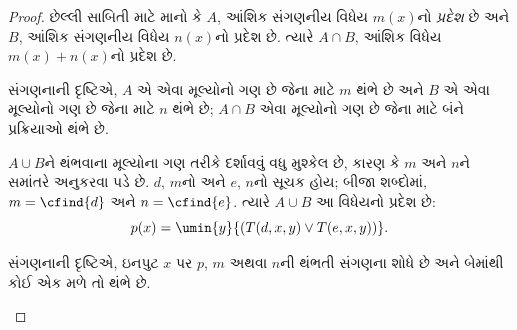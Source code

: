 \documentclass[../../../include/open-logic-section]{subfiles}
\begin{document}
\begin{proof}
છેલ્લી સાબિતી માટે માનો કે $A$, આંશિક સંગણનીય વિધેય $m(x)$નો
\emph{પ્રદેશ} છે અને $B$, આંશિક સંગણનીય વિધેય $n(x)$નો પ્રદેશ છે.
ત્યારે $A \cap B$, આંશિક વિધેય $m(x) + n(x)$નો પ્રદેશ છે.

\begin{explain}
સંગણનાની દૃષ્ટિએ, $A$ એ એવા મૂલ્યોનો ગણ છે જેના માટે
$m$ થંભે છે અને $B$ એ એવા મૂલ્યોનો ગણ છે જેના માટે
$n$ થંભે છે; $A \cap B$ એવા મૂલ્યોનો ગણ છે જેના માટે
બંને પ્રક્રિયાઓ થંભે છે.
\end{explain}

$A \cup B$ને થંભવાના મૂલ્યોના ગણ તરીકે દર્શાવવું વધુ
મુશ્કેલ છે, કારણ કે $m$ અને $n$ને સમાંતરે અનુકરવા પડે છે.
$d$, $m$નો અને $e$, $n$નો સૂચક હોય; બીજા શબ્દોમાં,
$m = \cfind{d}$ અને $n = \cfind{e}$. ત્યારે $A \cup B$
આ વિધેયનો પ્રદેશ છે:
\[
p(x) = \umin{y}{(T(d,x,y) \lor T(e,x,y))}.
\]
\begin{explain}
સંગણનાની દૃષ્ટિએ, ઇનપુટ $x$ પર $p$, $m$ અથવા $n$ની
થંભતી સંગણના શોધે છે અને બેમાંથી કોઈ એક મળે તો થંભે છે.
\end{explain}
\end{proof}
\end{document}
